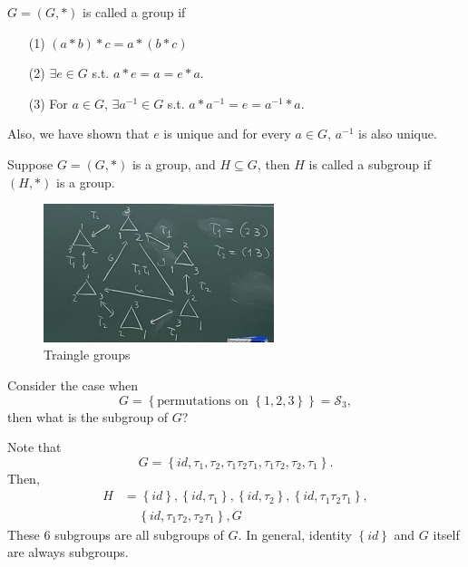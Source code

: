 \begin{prev}
    \(G = (G, *)\) is called a group if 
    \begin{itemize}
        \item [(1)] \((a * b) * c = a * (b * c)\)
        \item [(2)] \(\exists e \in G\) s.t. \(a * e = a = e * a\). 
        \item [(3)] For \(a \in G\), \(\exists a^{-1} \in G \) s.t. \(a * a^{-1} = e = a^{-1} * a\).      
    \end{itemize} 
    Also, we have shown that \(e\) is unique and for every \(a \in G\), \(a^{-1} \) is also unique.   
\end{prev}

\begin{definition}[Subgroup] \label{def: subgroup}
    Suppose \(G = (G, *)\) is a group, and \(H \subseteq G\), then \(H\) is called a subgroup if \((H, *)\) is a group.   
\end{definition}

\begin{figure}[H]
    \centering
    \includegraphics[width=0.6\textwidth]{./Figures/IMG_3952.jpg}
    \caption{Traingle groups}
    \label{fig:triangle groups}
\end{figure}
\begin{eg}
    Consider the case when 
 \[
    G = \left\{ \text{permutations on } \left\{ 1,2,3 \right\}  \right\} = \mathcal{S} _3, 
 \] then what is the subgroup of \(G\)? 
\end{eg}
\begin{explanation}
    Note that 
    \[
        G = \left\{ id, \tau _1, \tau _2, \tau _1 \tau _2 \tau _1, \tau _1 \tau _2, \tau _2, \tau _1 \right\}. 
    \]
    Then, 
    \begin{align*}
        H &= \left\{ id \right\}, \left\{ id, \tau _1 \right\}, \left\{ id, \tau _2 \right\}, \left\{ id, \tau _1 \tau _2 \tau _1 \right\}, \\
        &\quad \, \left\{ id, \tau _1 \tau _2, \tau _2 \tau _1 \right\}, G     
    \end{align*}
    These \(6\) subgroups are all subgroups of \(G\). In general, identity \(\left\{ id \right\} \) and \(G\) itself are always subgroups.    
\end{explanation}

